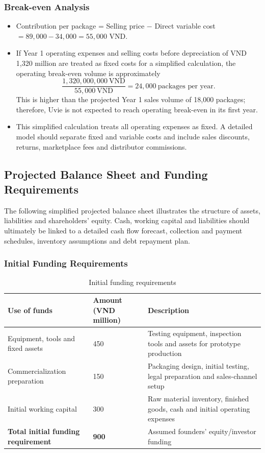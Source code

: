 \subsubsection{Break-even Analysis}
\begin{itemize}[itemsep=0pt]
  \item Contribution per package = Selling price $-$ Direct variable cost
    $= 89{,}000 - 34{,}000 = 55{,}000$ VND.
  \item If Year 1 operating expenses and selling costs before depreciation of
    VND 1,320 million are treated as fixed costs for a simplified calculation,
    the operating break-even volume is approximately
    \[
      \frac{1{,}320{,}000{,}000\ \text{VND}}{55{,}000\ \text{VND}} = 24{,}000
      \ \text{packages per year}.
    \]
    This is higher than the projected Year 1 sales volume of 18,000 packages;
    therefore, Uvie is not expected to reach operating break-even in its first
    year.
  \item This simplified calculation treats all operating expenses as fixed. A
    detailed model should separate fixed and variable costs and include sales
    discounts, returns, marketplace fees and distributor commissions.
\end{itemize}

\subsection{Projected Balance Sheet and Funding Requirements}
The following simplified projected balance sheet illustrates the structure of
assets, liabilities and shareholders' equity. Cash, working capital and
liabilities should ultimately be linked to a detailed cash flow forecast,
collection and payment schedules, inventory assumptions and debt repayment plan.

\subsubsection{Initial Funding Requirements}
\begin{table}[ht]
\centering\small
\caption{Initial funding requirements}\label{tab:funding}
\begin{tabular}{@{}L{4.4cm}L{2.6cm}L{7.2cm}@{}}
  \toprule
  \textbf{Use of funds} & \textbf{Amount (VND million)} & \textbf{Description}\\
  \midrule
  Equipment, tools and fixed assets & 450 & Testing equipment, inspection tools and assets for prototype production\\
  Commercialization preparation & 150 & Packaging design, initial testing, legal preparation and sales-channel setup\\
  Initial working capital & 300 & Raw material inventory, finished goods, cash and initial operating expenses\\
  \midrule
  \textbf{Total initial funding requirement} & \textbf{900} & Assumed founders' equity/investor funding\\
  \bottomrule
\end{tabular}
\end{table}

